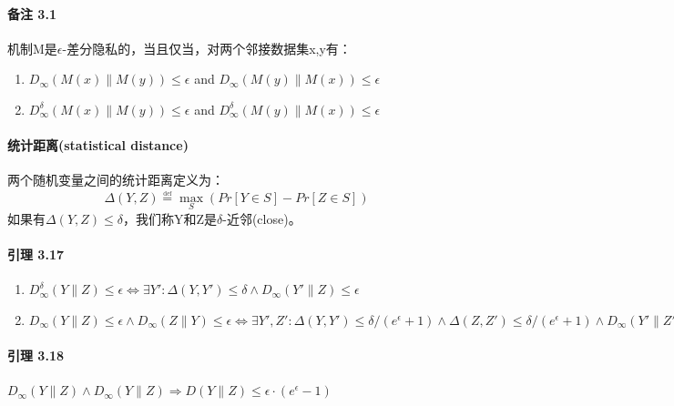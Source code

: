 \documentclass[12pt,a4paper]{article}
\begin{document}
\paragraph{备注 3.1} 机制M是$\epsilon$-差分隐私的，当且仅当，对两个邻接数据集x,y有：
\begin{enumerate}
	\item $D_{\infty}(M(x) \parallel M(y)) \leq \epsilon$ and $D_{\infty}(M(y) \parallel M(x)) \leq \epsilon$
	\item $D_{\infty}^{\delta}(M(x) \parallel M(y)) \leq \epsilon$ and $D_{\infty}^{\delta}(M(y) \parallel M(x)) \leq \epsilon$
\end{enumerate}
\paragraph{统计距离(statistical distance)} 两个随机变量之间的统计距离定义为：
\begin{equation}
	\Delta(Y,Z) \overset{\underset{\mathrm{def}}{}}{=} \max_S(Pr[Y \in S]-Pr[Z \in S])
\end{equation}
如果有$\Delta(Y,Z) \leq \delta $，我们称Y和Z是$\delta$-近邻(close)。
\paragraph{引理 3.17}
\begin{enumerate}
	\item $D_{\infty}^{\delta}(Y \parallel Z) \leq \epsilon \Leftrightarrow \exists Y': \Delta(Y,Y')\leq \delta \wedge D_{\infty}(Y' \parallel Z)\leq \epsilon$
	\item $D_{\infty}(Y \parallel Z)\leq \epsilon \wedge D_{\infty}(Z \parallel Y)\leq \epsilon \Leftrightarrow \exists Y',Z': \Delta(Y,Y')\leq \delta/(e^\epsilon+1) \wedge \Delta(Z,Z')\leq \delta/(e^\epsilon+1) \wedge D_{\infty}(Y' \parallel Z') \leq \epsilon$
\end{enumerate}
\paragraph{引理 3.18} $D_{\infty}(Y \parallel Z) \wedge D_{\infty}(Y \parallel Z) \Rightarrow D(Y \parallel Z)\leq \epsilon \cdot (e^\epsilon-1 )$
\end{document}

